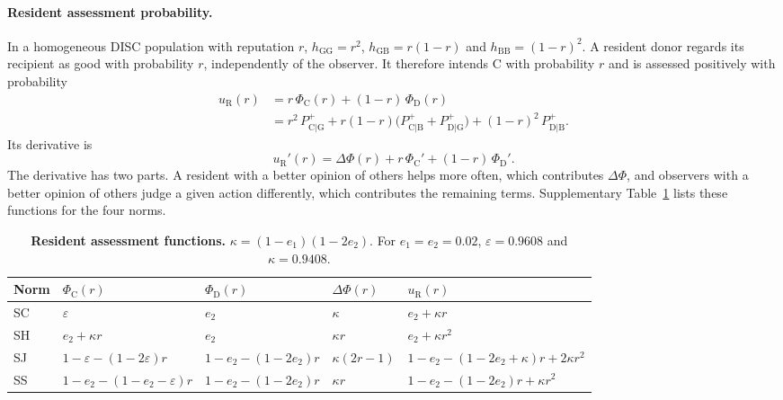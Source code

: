 \documentclass[10pt]{wlscirep}
\newcommand{\Pp}[1]{P^{+}_{\mathrm{#1}}}   %
\newcommand{\PhiC}{\Phi_{\mathrm{C}}}
\newcommand{\PhiD}{\Phi_{\mathrm{D}}}
\theoremstyle{plain}
\theoremstyle{remark}
\begin{document}
\paragraph{Resident assessment probability.} In a homogeneous DISC population with reputation $r$, $h_{\mathrm{GG}}=r^2$, $h_{\mathrm{GB}}=r(1-r)$ and $h_{\mathrm{BB}}=(1-r)^2$. A resident donor regards its recipient as good with probability $r$, independently of the observer. It therefore intends C with probability $r$ and is assessed positively with probability
\begin{equation}
\begin{aligned}
u_{\mathrm R}(r)&=r\,\PhiC(r)+(1-r)\,\PhiD(r)\\
&=r^2\,\Pp{C|G}+r(1-r)\bigl(\Pp{C|B}+\Pp{D|G}\bigr)+(1-r)^2\,\Pp{D|B}.
\end{aligned}
\label{eq:s-resident}
\end{equation}
Its derivative is
\begin{equation}
u_{\mathrm R}'(r)=\Delta\Phi(r)+r\,\PhiC'+(1-r)\,\PhiD'.
\label{eq:s-resident-derivative}
\end{equation}
The derivative has two parts. A resident with a better opinion of others helps more often, which contributes $\Delta\Phi$, and observers with a better opinion of others judge a given action differently, which contributes the remaining terms. Supplementary Table~\ref{tab:si-resident} lists these functions for the four norms.

\begin{table}[!htbp]
\centering
\caption{\textbf{Resident assessment functions.} $\kappa=(1-e_1)(1-2e_2)$. For $e_1=e_2=0.02$, $\varepsilon=0.9608$ and $\kappa=0.9408$.}
\label{tab:si-resident}
\small
\begin{tabular}{@{}lllll@{}}
\toprule
Norm & $\PhiC(r)$ & $\PhiD(r)$ & $\Delta\Phi(r)$ & $u_{\mathrm R}(r)$\\
\midrule
SC & $\varepsilon$ & $e_2$ & $\kappa$ & $e_2+\kappa r$\\
SH & $e_2+\kappa r$ & $e_2$ & $\kappa r$ & $e_2+\kappa r^2$\\
SJ & $1-\varepsilon-(1-2\varepsilon)r$ & $1-e_2-(1-2e_2)r$ & $\kappa(2r-1)$ & $1-e_2-(1-2e_2+\kappa)r+2\kappa r^2$\\
SS & $1-e_2-(1-e_2-\varepsilon)r$ & $1-e_2-(1-2e_2)r$ & $\kappa r$ & $1-e_2-(1-2e_2)r+\kappa r^2$\\
\bottomrule
\end{tabular}
\end{table}
\end{document}

